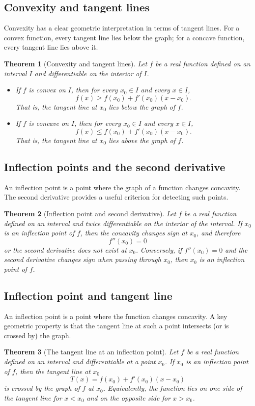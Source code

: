 \documentclass[11pt,a4paper]{article}
\theoremstyle{definition} \newtheorem{definition}{Definition} \theoremstyle{plain} \newtheorem{theorem}{Theorem}
\begin{document}
\subsection{Convexity and tangent lines}
Convexity has a clear geometric interpretation in terms of tangent lines.
For a convex function, every tangent line lies below the graph; for a concave function, every tangent line lies above it.
\begin{theorem}[Convexity and tangent lines]\label{thm:convexity-tangent} Let $f$ be a real function defined on an interval $I$ and differentiable on the interior of $I$. \begin{itemize}
\item If $f$ is convex on $I$, then for every $x_0 \in I$ and every $x \in I$,
\[
f(x) \ge f(x_0) + f'(x_0)(x - x_0).
\]
That is, the tangent line at $x_0$ lies below the graph of $f$.
\item If $f$ is concave on $I$, then for every $x_0 \in I$ and every $x \in I$,
\[
f(x) \le f(x_0) + f'(x_0)(x - x_0).
\]
That is, the tangent line at $x_0$ lies above the graph of $f$. \end{itemize} \end{theorem}
\subsection{Inflection points and the second derivative}
An inflection point is a point where the graph of a function changes concavity.
The second derivative provides a useful criterion for detecting such points.
\begin{theorem}[Inflection point and second derivative]\label{thm:inflection-second-derivative} Let $f$ be a real function defined on an interval and twice differentiable on the interior of the interval.
If $x_0$ is an inflection point of $f$, then the concavity changes sign at $x_0$, and therefore
\[ f''(x_0) = 0 \]
or the second derivative does not exist at $x_0$.
Conversely, if $f''(x_0)=0$ and the second derivative changes sign when passing through $x_0$, then $x_0$ is an inflection point of $f$. \end{theorem}
\subsection{Inflection point and tangent line}
An inflection point is a point where the function changes concavity.
A key geometric property is that the tangent line at such a point intersects (or is crossed by) the graph.
\begin{theorem}[The tangent line at an inflection point]\label{thm:tangent-inflection} Let $f$ be a real function defined on an interval and differentiable at a point $x_0$.
If $x_0$ is an inflection point of $f$, then the tangent line at $x_0$
\[ T(x) = f(x_0) + f'(x_0)(x - x_0) \]
is crossed by the graph of $f$ at $x_0$.
Equivalently, the function lies on one side of the tangent line for $x < x_0$ and on the opposite side for $x > x_0$. \end{theorem}
\end{document}
